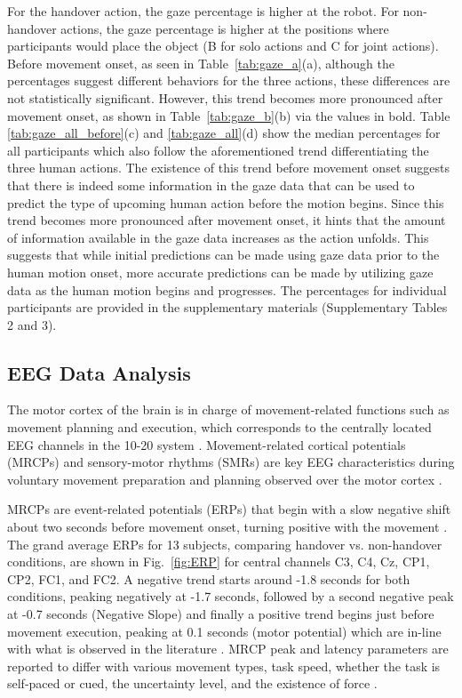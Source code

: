For the handover action, the gaze percentage is higher at the robot. For non-handover actions, the gaze percentage is higher at the positions where participants would place the object (B for solo actions and C for joint actions). Before movement onset, as seen in Table~\ref{tab:gaze_a}(a), although the percentages suggest different behaviors for the three actions, these differences are not statistically significant. However, this trend becomes more pronounced after movement onset, as shown in Table~\ref{tab:gaze_b}(b) via the values in bold. Table \ref{tab:gaze_all_before}(c) and \ref{tab:gaze_all}(d) show the median percentages for all participants which also follow the aforementioned trend differentiating the three human actions. The existence of this trend before movement onset suggests that there is indeed some information in the gaze data that can be used to predict the type of upcoming human action before the motion begins. Since this trend becomes more pronounced after movement onset, it hints that the amount of information available in the gaze data increases as the action unfolds. This suggests that while initial predictions can be made using gaze data prior to the human motion onset, more accurate predictions can be made by utilizing gaze data as the human motion begins and progresses.
The percentages for individual participants are provided in the supplementary materials (Supplementary Tables 2 and 3).


\subsection*{EEG Data Analysis}
The motor cortex of the brain is in charge of movement-related functions such as movement planning and execution, which corresponds to the centrally located EEG channels in the 10-20 system \cite{yahya19}. Movement-related cortical potentials (MRCPs) and sensory-motor rhythms (SMRs) are key EEG characteristics during voluntary movement preparation and planning observed over the motor cortex \cite{sumeyra22}. 

MRCPs are event-related potentials (ERPs) that begin with a slow negative shift about two seconds before movement onset, turning positive with the movement \cite{olsen21}. The grand average ERPs for 13 subjects, comparing handover vs. non-handover conditions, are shown in Fig.~\ref{fig:ERP} for central channels C3, C4, Cz, CP1, CP2, FC1, and FC2. A negative trend starts around -1.8 seconds for both conditions, peaking negatively at -1.7 seconds, followed by a second negative peak at -0.7 seconds (Negative Slope) and finally a positive trend begins just before movement execution, peaking at 0.1 seconds (motor potential) which are in-line with what is observed in the literature \cite{olsen21}. MRCP peak and latency parameters are reported to differ with various movement types, task speed, whether the task is self-paced or cued, the uncertainty level, and the existence of force \cite{brunia2003cnv, nascimento2006movement, rektor2003intracerebral}.

